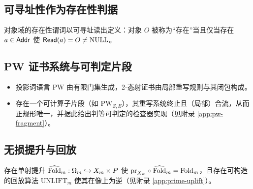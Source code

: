 \subsection{可寻址性作为存在性判据}
对象域的存在性谓词以可寻址读出定义：对象 $O$ 被称为“存在”当且仅当存在 $a\in\mathsf{Addr}$ 使 $\mathsf{Read}(a)=O\neq\mathrm{NULL}$。

\subsection{PW 证书系统与可判定片段}
\begin{itemize}
  \item 投影词语言 $\mathrm{PW}$ 由有限门集生成，2-态射证书由局部重写规则与其闭包构成。
  \item 存在一个可计算子片段（如 $\mathrm{PW}_{Z,E}$），其重写系统终止且（局部）合流，从而正规形唯一，并据此给出判等可判定的检查器实现（见附录 \ref{app:pw-fragment}）。
\end{itemize}

\subsection{无损提升与回放}
存在单射提升 $\widehat{\mathrm{Fold}}_m:\Omega_m\hookrightarrow X_m\times P$ 使 $\mathrm{pr}_{X_m}\circ\widehat{\mathrm{Fold}}_m=\mathrm{Fold}_m$，且存在可构造的回放算法 $\mathrm{UNLIFT}_m$ 使其在像上为逆（见附录 \ref{app:prime-uplift}）。

